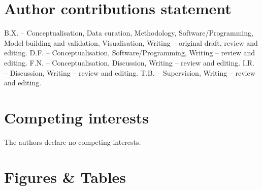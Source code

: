 \documentclass[fleqn,10pt]{wlscirep}
\begin{document}
\section*{Author contributions statement}
B.X. -- Conceptualisation, Data curation, Methodology, Software/Programming, Model building and validation, Visualisation, Writing -- original draft, review and editing. 
D.F. -- Conceptualisation, Software/Programming, Writing -- review and editing.
F.N. -- Conceptualisation, Discussion, Writing -- review and editing.
I.R. -- Discussion, Writing -- review and editing.
T.B. -- Supervision, Writing -- review and editing.


\section*{Competing interests} %
The authors declare no competing interests.

\newpage
\section*{Figures \& Tables}


\end{document}
